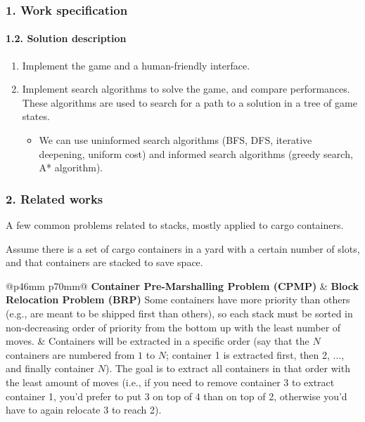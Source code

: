 \documentclass{beamer}
\def\\{}
\begin{document}
\begin{frame}
\frametitle{1. Work specification}
\framesubtitle{1.2. Solution description}

\begin{enumerate}
  \itemsep0em
  \item Implement the game and a human-friendly interface.
  \item Implement search algorithms to solve the game, and compare performances. These algorithms are used to search for a path to a solution in a tree of game states.

  \begin{itemize}
    \itemsep0em
    \item We can use uninformed search algorithms (BFS, DFS, iterative deepening, uniform cost) and informed search algorithms (greedy search, A* algorithm).
  \end{itemize}
\end{enumerate}

\end{frame}

\begin{frame}
\frametitle{2. Related works}

A few common problems related to stacks, mostly applied to cargo containers.

Assume there is a set of cargo containers in a yard with a certain number of slots, and that containers are stacked to save space.

\vspace{0.5em}

\begin{tabular}{@{}p{46mm} p{70mm}@{}}
  \textbf{Container Pre-Marshalling Problem (CPMP)} & \textbf{Block Relocation Problem (BRP)} \\
  Some containers have more priority than others (e.g., are meant to be shipped first than others), so each stack must be sorted in non-decreasing order of priority from the bottom up with the least number of moves. &
  Containers will be extracted in a specific order (say that the $N$ containers are numbered from $1$ to $N$; container 1 is extracted first, then 2, ..., and finally container $N$). The goal is to extract all containers in that order with the least amount of moves (i.e., if you need to remove container 3 to extract container 1, you'd prefer to put 3 on top of 4 than on top of 2, otherwise you'd have to again relocate 3 to reach 2).
\end{tabular}

\end{frame}
\end{document}
